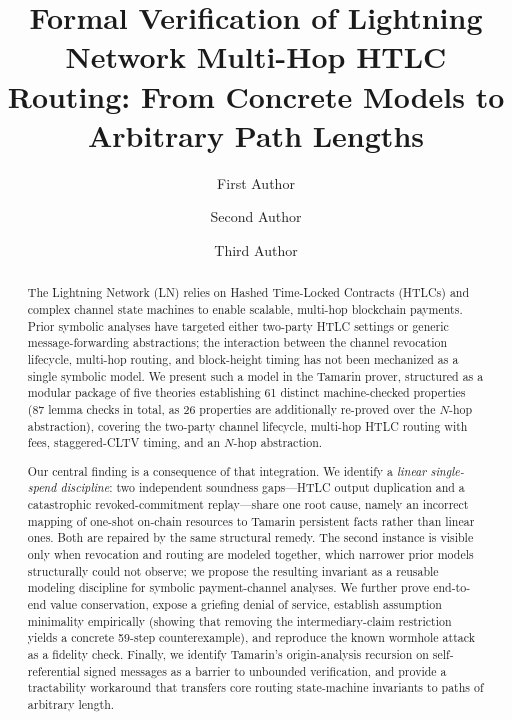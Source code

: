 \documentclass[sigconf,review]{acmart}
\theoremstyle{acmdefinition}
\begin{document}
\title{Formal Verification of Lightning Network Multi-Hop HTLC Routing: From Concrete Models to Arbitrary Path Lengths}

\author{First Author}

\author{Second Author}

\author{Third Author}

\begin{abstract}
The Lightning Network (LN) relies on Hashed Time-Locked Contracts (HTLCs) and complex channel state machines to enable scalable, multi-hop blockchain payments. Prior symbolic analyses have targeted either two-party HTLC settings or generic message-forwarding abstractions; the interaction between the channel revocation lifecycle, multi-hop routing, and block-height timing has not been mechanized as a single symbolic model. We present such a model in the Tamarin prover, structured as a modular package of five theories establishing 61 distinct machine-checked properties (87 lemma checks in total, as 26 properties are additionally re-proved over the $N$-hop abstraction), covering the two-party channel lifecycle, multi-hop HTLC routing with fees, staggered-CLTV timing, and an $N$-hop abstraction.

Our central finding is a consequence of that integration. We identify a \emph{linear single-spend discipline}: two independent soundness gaps---HTLC output duplication and a catastrophic revoked-commitment replay---share one root cause, namely an incorrect mapping of one-shot on-chain resources to Tamarin persistent facts rather than linear ones. Both are repaired by the same structural remedy. The second instance is visible only when revocation and routing are modeled together, which narrower prior models structurally could not observe; we propose the resulting invariant as a reusable modeling discipline for symbolic payment-channel analyses. We further prove end-to-end value conservation, expose a griefing denial of service, establish assumption minimality empirically (showing that removing the intermediary-claim restriction yields a concrete 59-step counterexample), and reproduce the known wormhole attack as a fidelity check. Finally, we identify Tamarin's origin-analysis recursion on self-referential signed messages as a barrier to unbounded verification, and provide a tractability workaround that transfers core routing state-machine invariants to paths of arbitrary length.
\end{abstract}
\end{document}
